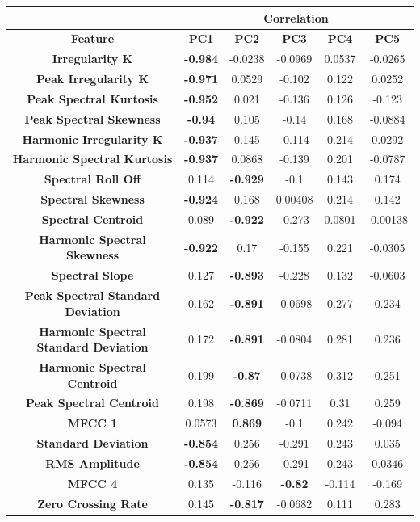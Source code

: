 		\begin{table}[h!]
			\centering
			\begin{tabular}{|c|c|c|c|c|c|}
				\cline{2-6}
				\multicolumn{1}{c}{} & \multicolumn{5}{|c|}{\bf{Correlation}} \tabularnewline
				\hline
				\bf{Feature} & \bf{PC1} & \bf{PC2} & \bf{PC3} & \bf{PC4} & \bf{PC5} \tabularnewline
				\hline
				\hline
				\bf{Irregularity K} & \bf{-0.984} & -0.0238 & -0.0969 & 0.0537 & -0.0265 \tabularnewline
				\hline
				\bf{Peak Irregularity K} & \bf{-0.971} & 0.0529 & -0.102 & 0.122 & 0.0252 \tabularnewline
				\hline
				\bf{Peak Spectral Kurtosis} & \bf{-0.952} & 0.021 & -0.136 & 0.126 & -0.123 \tabularnewline
				\hline
				\bf{Peak Spectral Skewness} & \bf{-0.94} & 0.105 & -0.14 & 0.168 & -0.0884 \tabularnewline
				\hline
				\bf{Harmonic Irregularity K} & \bf{-0.937} & 0.145 & -0.114 & 0.214 & 0.0292 \tabularnewline
				\hline
				\bf{Harmonic Spectral Kurtosis} & \bf{-0.937} & 0.0868 & -0.139 & 0.201 & -0.0787 \tabularnewline
				\hline
				\bf{Spectral Roll Off} & 0.114 & \bf{-0.929} & -0.1 & 0.143 & 0.174 \tabularnewline
				\hline
				\bf{Spectral Skewness} & \bf{-0.924} & 0.168 & 0.00408 & 0.214 & 0.142 \tabularnewline
				\hline
				\bf{Spectral Centroid} & 0.089 & \bf{-0.922} & -0.273 & 0.0801 & -0.00138 \tabularnewline
				\hline
				\bf{Harmonic Spectral Skewness} & \bf{-0.922} & 0.17 & -0.155 & 0.221 & -0.0305 \tabularnewline
				\hline
				\bf{Spectral Slope} & 0.127 & \bf{-0.893} & -0.228 & 0.132 & -0.0603 \tabularnewline
				\hline
				\bf{Peak Spectral Standard Deviation} & 0.162 & \bf{-0.891} & -0.0698 & 0.277 & 0.234 \tabularnewline
				\hline
				\bf{Harmonic Spectral Standard Deviation} & 0.172 & \bf{-0.891} & -0.0804 & 0.281 & 0.236 \tabularnewline
				\hline
				\bf{Harmonic Spectral Centroid} & 0.199 & \bf{-0.87} & -0.0738 & 0.312 & 0.251 \tabularnewline
				\hline
				\bf{Peak Spectral Centroid} & 0.198 & \bf{-0.869} & -0.0711 & 0.31 & 0.259 \tabularnewline
				\hline
				\bf{MFCC 1} & 0.0573 & \bf{0.869} & -0.1 & 0.242 & -0.094 \tabularnewline
				\hline
				\bf{Standard Deviation} & \bf{-0.854} & 0.256 & -0.291 & 0.243 & 0.035 \tabularnewline
				\hline
				\bf{RMS Amplitude} & \bf{-0.854} & 0.256 & -0.291 & 0.243 & 0.0346 \tabularnewline
				\hline
				\bf{MFCC 4} & 0.135 & -0.116 & \bf{-0.82} & -0.114 & -0.169 \tabularnewline
				\hline
				\bf{Zero Crossing Rate} & 0.145 & \bf{-0.817} & -0.0682 & 0.111 & 0.283 \tabularnewline
				\hline
			\end{tabular}
		\end{table}

